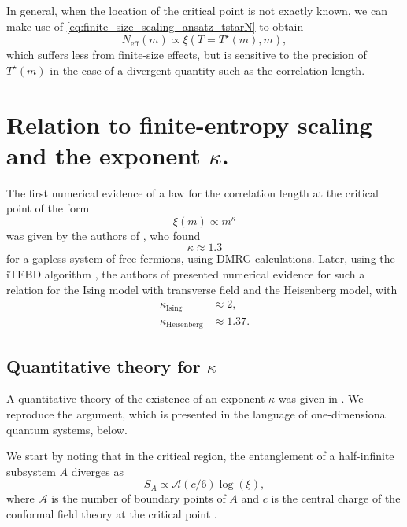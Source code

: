 In general, when the location of the critical point is not exactly known,
we can make use of \autoref{eq:finite_size_scaling_ansatz_tstarN} to obtain
\begin{equation}\label{eq:N_eff_propto_xi_at_Tstar}
  N_{\text{eff}}(m) \propto \xi(T = T^{\star}(m), m),
\end{equation}
which suffers less from finite-size effects, but is sensitive to the precision of $T^{\star}(m)$ in the case of a
divergent quantity such as the correlation length.

\section{Relation to finite-entropy scaling and the exponent $\kappa$.}

The first numerical evidence of a law for the correlation length at the critical point of the form
\begin{equation}\label{eq:xi_propto_m_kappa}
  \xi(m) \propto m^{\kappa}
\end{equation}
was given by the authors of \cite{andersson1999density}, who found
\begin{equation}
  \kappa \approx 1.3
\end{equation}
for a gapless system of free fermions, using DMRG calculations. Later, using the iTEBD algorithm
\cite{vidal2007classical}, the authors of \cite{tagliacozzo2008scaling} presented numerical evidence for such a relation
for the Ising model with transverse field and the Heisenberg model, with
\begin{align}
  \kappa_{\text{Ising}} & \approx 2, \\
  \kappa_{\text{Heisenberg}} & \approx 1.37.
\end{align}

\subsection{Quantitative theory for $\kappa$}
A quantitative theory of the existence of an exponent $\kappa$ was given in \cite{pollmann2009theory}.
We reproduce the argument, which is presented in the language of one-dimensional quantum systems, below.

We start by noting that in the critical region, the entanglement of a half-infinite subsystem $A$ diverges as
\begin{equation}\label{eq:entropy_scaling_near_criticality}
  S_A \propto \mathcal{A}(c/6)\log(\xi),
\end{equation}
where $\mathcal{A}$ is the number of boundary points of $A$ and $c$ is the central charge of the conformal field theory
at the critical point \cite{calabrese2004entanglement, vidal2003entanglement, ercolessi2010exact}.

